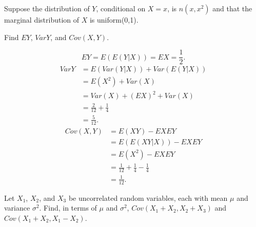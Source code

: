 \documentclass[14pt]{elegantbook}
\begin{document}


\setcounter{chapter}{3}

\chapter{}
\setcounter{exer}{29}
    \begin{exercise}
        Suppose the distribution of $Y$, conditional on $X=x$, is $n(x, x^2)$ and that the marginal distribution of $X$ is uniform(0,1). 
        
        Find $EY$, $Var Y$, and $Cov(X, Y)$. 
    \end{exercise}

    \begin{solution}
        \[EY=E(E(Y|X))=EX=\frac{1}{2}. \]
        \begin{align*}
            VarY&=E(Var(Y|X))+Var(E(Y|X))\\
            &=E(X^2)+Var(X)\\
            &=Var(X)+(EX)^2+Var(X)\\
            &=\frac{2}{12}+\frac{1}{4}\\
            &=\frac{5}{12}.
        \end{align*}
        \begin{align*}
            Cov(X, Y)&=E(XY)-EXEY\\
            &=E(E(XY|X))-EXEY\\
            &=E(X^2)-EXEY\\
            &=\frac{1}{12}+\frac{1}{4}-\frac{1}{4}\\
            &=\frac{1}{12}.
        \end{align*}
    \end{solution}

    \setcounter{exer}{42}
    \begin{exercise}
        Let $X_1$, $X_2$, and $X_3$ be uncorrelated random variables, each with mean $\mu$ and variance $\sigma^2$. Find, in terms of $\mu$ and $\sigma^2$, $Cov(X_1 + X_2, X_2 + X_3)$ and $Cov(X_1 + X_2, X_1 - X_2)$. 
    \end{exercise}
\end{document}
